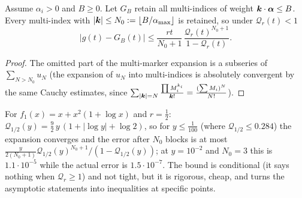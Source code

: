 \begin{corollary}
\label{cor:cutoff-bound}
Assume $\alpha_i>0$ and $B\ge0$. Let $G_B$ retain all multi-indices of weight $\boldsymbol k\cdot\boldsymbol\alpha\le B$. Every multi-index with $|\boldsymbol k|\le N_0:=\lfloor B/\alpha_{\max}\rfloor$ is retained, so under $\mathcal Q_r(t)<1$
\[
 |g(t)-G_B(t)|\le\frac{rt}{N_0+1}\,\frac{\mathcal Q_r(t)^{N_0+1}}{1-\mathcal Q_r(t)} .
\]
\end{corollary}
\begin{proof}
The omitted part of the multi-marker expansion is a subseries of $\sum_{N>N_0}u_N$ (the expansion of $u_N$ into multi-indices is absolutely convergent by the same Cauchy estimates, since $\sum_{|\boldsymbol k|=N}\frac{\prod M_i^{k_i}}{\boldsymbol k!}=\frac{(\sum M_i)^N}{N!}$).
\end{proof}

\begin{example}
For $f_1(x)=x+x^2(1+\log x)$ and $r=\frac12$: $\mathcal Q_{1/2}(y)=\frac92\,y\,(1+|\log y|+\log2)$, so for $y\le\frac1{100}$ (where $\mathcal Q_{1/2}\le0.284$) the expansion converges and the error after $N_0$ blocks is at most $\frac{y}{2(N_0+1)}\mathcal Q_{1/2}(y)^{N_0+1}/(1-\mathcal Q_{1/2}(y))$; at $y=10^{-2}$ and $N_0=3$ this is $1.1\cdot10^{-5}$ while the actual error is $1.5\cdot10^{-7}$. The bound is conditional (it says nothing when $\mathcal Q_r\ge1$) and not tight, but it is rigorous, cheap, and turns the asymptotic statements into inequalities at specific points.
\end{example}
